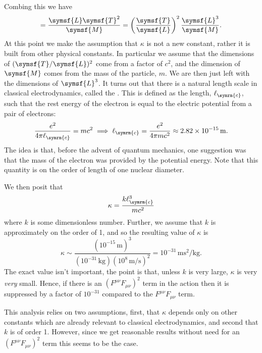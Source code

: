\documentclass[fleqn]{NotesClass}
\newcommand*{\dimension}[1]{\symsf{#1}}
\newcommand*{\classicalElectronRadius}{\ell_{\symrm{c}}}
\begin{document}
    Combing this we have
    \begin{equation}
        [\kappa] = \frac{\dimension{L}\dimension{T}^2}{\dimension{M}} = \left( \frac{\dimension{T}}{\dimension{L}} \right)^2 \frac{\dimension{L}^3}{\dimension{M}}.
    \end{equation}
    At this point we make the assumption that \(\kappa\) is not a new constant, rather it is built from other physical constants.
    In particular we assume that the dimensions of \((\dimension{T}/\dimension{L})^2\) come from a factor of \(c^2\), and the dimension of \(\dimension{M}\) comes from the mass of the particle, \(m\).
    We are then just left with the dimensions of \(\dimension{L}^3\).
    It turns out that there is a natural length scale in classical electrodynamics, called the .
    This is defined as the length, \(\classicalElectronRadius\), such that the rest energy of the electron is equal to the electric potential from a pair of electrons:
    \begin{equation}
        \frac{e^2}{4\pi\classicalElectronRadius} = mc^2 \implies \classicalElectronRadius = \frac{e^2}{4\pi mc^2} \approx \qty{2.82e-15}{\metre}.
    \end{equation}
    The idea is that, before the advent of quantum mechanics, one suggestion was that the mass of the electron was provided by the potential energy.
    Note that this quantity is on the order of length of one nuclear diameter.
    
    We then posit that
    \begin{equation}
        \kappa = \frac{k\classicalElectronRadius^3}{mc^2}
    \end{equation}
    where \(k\) is some dimensionless number.
    Further, we assume that \(k\) is approximately on the order of 1, and so the resulting value of \(\kappa\) is
    \begin{equation}
        \kappa \sim \frac{(10^{-15}\,\unit{\metre})^3}{(10^{-31}\,\unit{\kilogram})(10^{8} \,\unit{\metre\per\second})^2} = 10^{-31}\,\unit{\metre\second\squared\per\kilogram}.
    \end{equation}
    The exact value isn't important, the point is that, unless \(k\) is very large, \(\kappa\) is very \emph{very} small.
    Hence, if there is an \((F^{\mu\nu}F_{\mu\nu})^2\) term in the action then it is suppressed by a factor of \(10^{-31}\) compared to the \(F^{\mu\nu}F_{\mu\nu}\) term.
    
    This analysis relies on two assumptions, first, that \(\kappa\) depends only on other constants which are already relevant to classical electrodynamics, and second that \(k\) is of order 1.
    However, since we get reasonable results without need for an \((F^{\mu\nu}F_{\mu\nu})^2\) term this seems to be the case.
    
\end{document}
